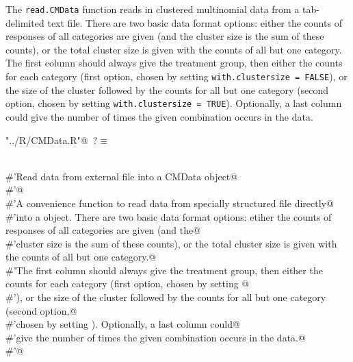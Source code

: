 \documentclass[reqno]{amsart}
\renewcommand{\NWtarget}[2]{\hypertarget{#1}{#2}}
\begin{document}
The \texttt{read.CMData} function reads in clustered multinomial data from a tab-delimited
text file. There are two basic data format options:  either the counts of responses of all categories are given (and the
cluster size is the sum of these counts), or  the total cluster size is given with the counts of all but one category.
The first column should always give the treatment group, then either the counts for each category (first option, chosen by setting 
\texttt{with.clustersize = FALSE}), or the size of the cluster followed by the counts for all but one category (second option,
chosen by setting \texttt{with.clustersize = TRUE}). Optionally, a last column could
give the number of times the given combination occurs in the data.

\begin{flushleft} \small
\begin{minipage}{\linewidth}\label{scrap3}\raggedright\small
\NWtarget{nuweb?}{} \verb@"../R/CMData.R"@\nobreak\ {\footnotesize {?}}$\equiv$
\vspace{-1ex}
\begin{list}{}{} \item
\mbox{}\verb@@\\
\mbox{}\verb@#'Read data from external file into a CMData object@\\
\mbox{}\verb@#'@\\
\mbox{}\verb@#'A convenience function to read data from specially structured file directly@\\
\mbox{}\verb@#'into a  object. There are two basic data format options:  etiher the counts of responses of all categories are given (and the@\\
\mbox{}\verb@#'cluster size is the sum of these counts), or  the total cluster size is given with the counts of all but one category.@\\
\mbox{}\verb@#'The first column should always give the treatment group, then either the counts for each category (first option, chosen by setting @\\
\mbox{}\verb@#'), or the size of the cluster followed by the counts for all but one category (second option,@\\
\mbox{}\verb@#'chosen by setting ). Optionally, a last column could@\\
\mbox{}\verb@#'give the number of times the given combination occurs in the data.@\\
\mbox{}\verb@#'@\\

\end{list}
\end{minipage}
\end{flushleft}
\end{document}
